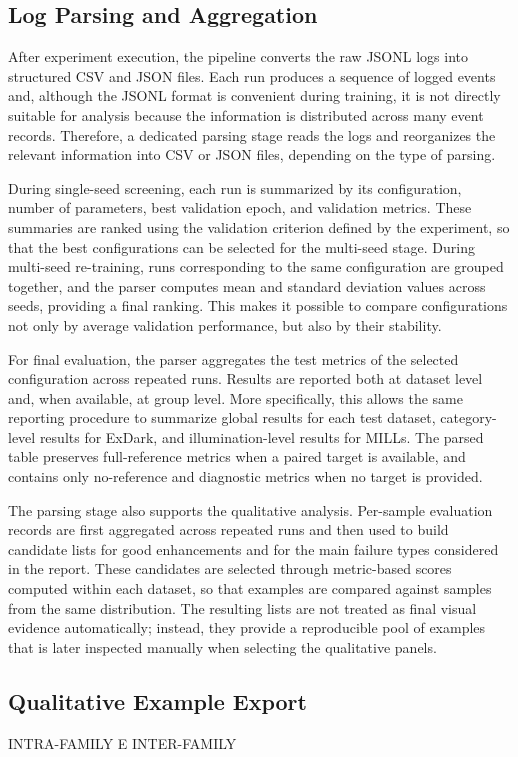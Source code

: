 \subsection{Log Parsing and Aggregation}

After experiment execution, the pipeline converts the raw JSONL logs into structured CSV and JSON files. Each run produces a sequence of logged events and, although the JSONL format is convenient during training, it is not directly suitable for analysis because the information is distributed across many event records. Therefore, a dedicated parsing stage reads the logs and reorganizes the relevant information into CSV or JSON files, depending on the type of parsing.

During single-seed screening, each run is summarized by its configuration, number of parameters, best validation epoch, and validation metrics. These summaries are ranked using the validation criterion defined by the experiment, so that the best configurations can be selected for the multi-seed stage. During multi-seed re-training, runs corresponding to the same configuration are grouped together, and the parser computes mean and standard deviation values across seeds, providing a final ranking. This makes it possible to compare configurations not only by average validation performance, but also by their stability.

For final evaluation, the parser aggregates the test metrics of the selected configuration across repeated runs. Results are reported both at dataset level and, when available, at group level. More specifically, this allows the same reporting procedure to summarize global results for each test dataset, category-level results for ExDark, and illumination-level results for MILLs. The parsed table preserves full-reference metrics when a paired target is available, and contains only no-reference and diagnostic metrics when no target is provided.

The parsing stage also supports the qualitative analysis. Per-sample evaluation records are first aggregated across repeated runs and then used to build candidate lists for good enhancements and for the main failure types considered in the report. These candidates are selected through metric-based scores computed within each dataset, so that examples are compared against samples from the same distribution. The resulting lists are not treated as final visual evidence automatically; instead, they provide a reproducible pool of examples that is later inspected manually when selecting the qualitative panels.

\subsection{Qualitative Example Export}

INTRA-FAMILY E INTER-FAMILY